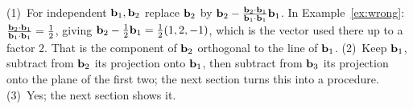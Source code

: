 \documentclass[11pt]{article}
\begin{document}
\begin{description}[leftmargin=0pt,itemsep=5pt]
  \item[Questions to think about.] (1)~For independent $\mathbf{b}_1,\mathbf{b}_2$ replace $\mathbf{b}_2$ by $\mathbf{b}_2-\tfrac{\mathbf{b}_2\cdot\mathbf{b}_1}{\mathbf{b}_1\cdot\mathbf{b}_1}\mathbf{b}_1$. In Example~\ref{ex:wrong}: $\tfrac{\mathbf{b}_2\cdot\mathbf{b}_1}{\mathbf{b}_1\cdot\mathbf{b}_1}=\tfrac12$, giving $\mathbf{b}_2-\tfrac12\mathbf{b}_1=\tfrac12(1,2,-1)$, which is the vector used there up to a factor $2$. That is the component of $\mathbf{b}_2$ orthogonal to the line of $\mathbf{b}_1$. (2)~Keep $\mathbf{b}_1$, subtract from $\mathbf{b}_2$ its projection onto $\mathbf{b}_1$, then subtract from $\mathbf{b}_3$ its projection onto the plane of the first two; the next section turns this into a procedure. (3)~Yes; the next section shows it.
\end{description}
\end{document}
